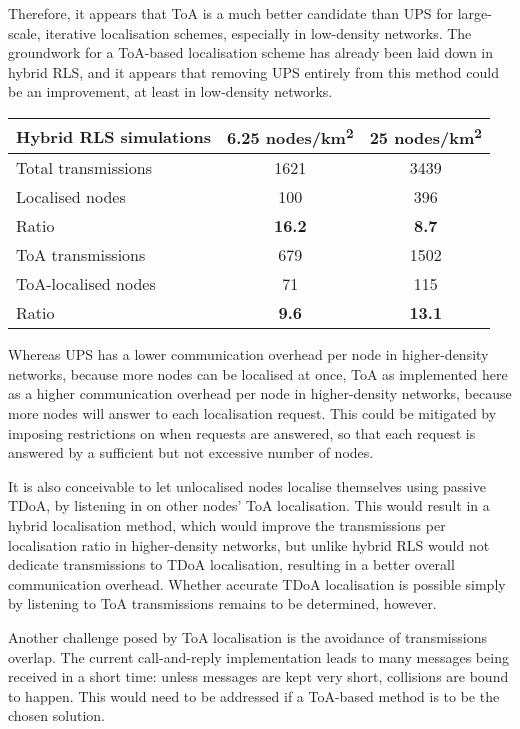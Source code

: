 \documentclass[12pt,a4paper,fleqn]{report}
\begin{document}
Therefore, it appears that ToA is a much better candidate than UPS for large-scale, iterative localisation schemes, especially in low-density networks. The groundwork for a ToA-based localisation scheme has already been laid down in hybrid RLS, and it appears that removing UPS entirely from this method could be an improvement, at least in low-density networks.

\begin{table}[H]
\centering
\begin{tabular}{|l|c|c|}
	\hline
	Hybrid RLS simulations & \textbf{6.25 nodes/km\textsuperscript{2}} & \textbf{25 nodes/km\textsuperscript{2}} \\
	\hline
	Total transmissions	& 1621			& 3439			\\
	Localised nodes		& 100			& 396			\\
	Ratio				& \textbf{16.2}	& \textbf{8.7}	\\
	\hline
	ToA transmissions	& 679			& 1502			\\
	ToA-localised nodes	& 71			& 115			\\
	Ratio				& \textbf{9.6}	& \textbf{13.1}	\\
	\hline
\end{tabular}
\end{table}

Whereas UPS has a lower communication overhead per node in higher-density networks, because more nodes can be localised at once, ToA as implemented here as a higher communication overhead per node in higher-density networks, because more nodes will answer to each localisation request. This could be mitigated by imposing restrictions on when requests are answered, so that each request is answered by a sufficient but not excessive number of nodes.

It is also conceivable to let unlocalised nodes localise themselves using passive TDoA, by listening in on other nodes' ToA localisation. This would result in a hybrid localisation method, which would improve the transmissions per localisation ratio in higher-density networks, but unlike hybrid RLS would not dedicate transmissions to TDoA localisation, resulting in a better overall communication overhead. Whether accurate TDoA localisation is possible simply by listening to ToA transmissions remains to be determined, however.

Another challenge posed by ToA localisation is the avoidance of transmissions overlap. The current call-and-reply implementation leads to many messages being received in a short time: unless messages are kept very short, collisions are bound to happen. This would need to be addressed if a ToA-based method is to be the chosen solution.
\end{document}
